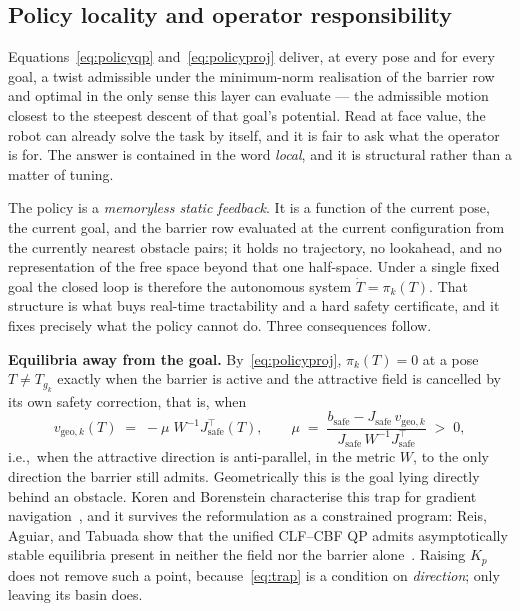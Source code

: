 \documentclass[12pt,a4paper,twoside,openright]{report}
\begin{document}
\subsection{Policy locality and operator responsibility}
\label{sec:locality}

Equations~\eqref{eq:policyqp} and~\eqref{eq:policyproj} deliver, at every pose and for every goal, a twist admissible under the minimum-norm realisation of the barrier row and optimal in the only sense this layer can evaluate --- the admissible motion closest to the steepest descent of that goal's potential. Read at face value, the robot can already solve the task by itself, and it is fair to ask what the operator is for. The answer is contained in the word \emph{local}, and it is structural rather than a matter of tuning.

The policy is a \emph{memoryless static feedback}. It is a function of the current pose, the current goal, and the barrier row evaluated at the current configuration from the currently nearest obstacle pairs; it holds no trajectory, no lookahead, and no representation of the free space beyond that one half-space. Under a single fixed goal the closed loop is therefore the autonomous system $\dot{T} = \pi_k(T)$. That structure is what buys real-time tractability and a hard safety certificate, and it fixes precisely what the policy cannot do. Three consequences follow.

\textbf{Equilibria away from the goal.} By~\eqref{eq:policyproj}, $\pi_k(T) = 0$ at a pose $T \neq T_{g_k}$ exactly when the barrier is active and the attractive field is cancelled by its own safety correction, that is, when
\begin{equation}
v_{\text{geo},k}(T) \;=\; -\mu\;W^{-1}J_{\text{safe}}^{\top}(T),
\qquad
\mu \;=\; \frac{b_{\text{safe}} - J_{\text{safe}}\,v_{\text{geo},k}}{J_{\text{safe}}\,W^{-1}J_{\text{safe}}^{\top}} \;>\; 0,
\label{eq:trap}
\end{equation}
i.e.,\ when the attractive direction is anti-parallel, in the metric $W$, to the only direction the barrier still admits. Geometrically this is the goal lying directly behind an obstacle. Koren and Borenstein characterise this trap for gradient navigation~\cite{koren1991potential}, and it survives the reformulation as a constrained program: Reis, Aguiar, and Tabuada show that the unified CLF--CBF QP admits asymptotically stable equilibria present in neither the field nor the barrier alone~\cite{reis2021undesirable}. Raising $K_p$ does not remove such a point, because~\eqref{eq:trap} is a condition on \emph{direction}; only leaving its basin does.
\end{document}

